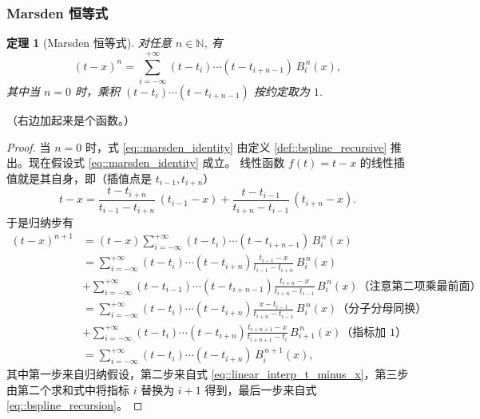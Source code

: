 \documentclass[a4paper]{ctexart}
\newtheorem{theorem}{定理}
\numberwithin{theorem}{section}
\numberwithin{equation}{section}
\numberwithin{figure}{section}
\numberwithin{remark}{section}
\begin{document}
\subsubsection{Marsden 恒等式}
\label{subsubsec::marsden_identity}

\begin{theorem}[Marsden 恒等式]
    \label{thm::marsden_identity}
对任意 $n\in\mathbb{N}$, 有
\begin{equation}
\label{eq::marsden_identity}
(t-x)^n=\sum_{i=-\infty}^{+\infty}(t-t_i)\cdots (t-t_{i+n-1})\,B^{\,n}_i(x),
\end{equation}
其中当 $n=0$ 时，乘积 $(t-t_i)\cdots (t-t_{i+n-1})$ 按约定取为 $1$.
\end{theorem}

（右边加起来是个函数。）

\begin{proof}
当 $n=0$ 时，式 \eqref{eq::marsden_identity} 由定义 \ref{def::bspline_recursive} 推出。现在假设式 \eqref{eq::marsden_identity} 成立。
线性函数 $f(t)=t-x$ 的线性插值就是其自身，即（插值点是 $t_{i-1}, t_{i+n}$）
\begin{equation}
\label{eq::linear_interp_t_minus_x}
t-x=\frac{t-t_{i+n}}{t_{i-1}-t_{i+n}}\,(t_{i-1}-x)+\frac{t-t_{i-1}}{t_{i+n}-t_{i-1}}\,(t_{i+n}-x).
\end{equation}
于是归纳步有
\[
\begin{aligned}
(t-x)^{n+1}
&=(t-x)\sum_{i=-\infty}^{+\infty}(t-t_i)\cdots (t-t_{i+n-1})\,B^{\,n}_i(x) \\
&=\sum_{i=-\infty}^{+\infty}(t-t_i)\cdots (t-t_{i+n}) 
\frac{t_{i-1}-x}{t_{i-1}-t_{i+n}}\,B^{\,n}_i(x) \\
&+\sum_{i=-\infty}^{+\infty}(t-t_{i-1})\cdots (t-t_{i+n-1})
\frac{t_{i+n}-x}{t_{i+n}-t_{i-1}}\,B^{\,n}_i(x) \mbox{（注意第二项乘最前面）}\\
&=\sum_{i=-\infty}^{+\infty}(t-t_i)\cdots (t-t_{i+n})
\frac{x-t_{i-1}}{t_{i+n}-t_{i-1}}\,B^{\,n}_i(x) \mbox{（分子分母同换）}\\
&+\sum_{i=-\infty}^{+\infty}(t-t_i)\cdots (t-t_{i+n})
\frac{t_{i+n+1}-x}{t_{i+n+1}-t_i}\,B^{\,n}_{i+1}(x) \mbox{（指标加 $1$）}\\
&=\sum_{i=-\infty}^{+\infty}(t-t_i)\cdots (t-t_{i+n})\,B^{\,n+1}_i(x),
\end{aligned}
\]
其中第一步来自归纳假设，第二步来自式 \eqref{eq::linear_interp_t_minus_x}，第三步由第二个求和式中将指标 $i$ 替换为 $i+1$ 得到，最后一步来自式 \eqref{eq::bspline_recursion}。
\end{proof}
\end{document}
